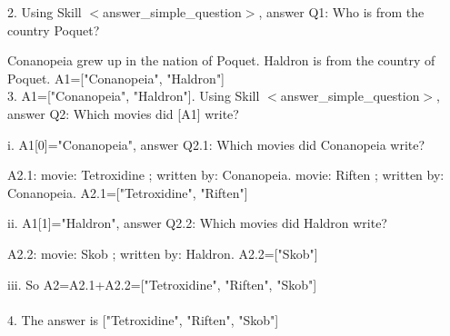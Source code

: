 \documentclass{article} %
\begin{document}
\begin{tcolorbox}[title = {CommaQA-E}, colback = Apricot!25!white, colframe = BrickRed!75!black]
\quad
   
2. Using Skill $<$answer\_simple\_question$>$, answer Q1: Who is from the country Poquet? 

Conanopeia grew up in the nation of Poquet. Haldron is from the country of Poquet. A1=["Conanopeia", "Haldron"] \\
3. A1=["Conanopeia", "Haldron"]. Using Skill $<$answer\_simple\_question$>$, answer Q2: Which movies did [A1] write? 

\quad

   \qquad  i. A1[0]="Conanopeia", answer Q2.1: Which movies did Conanopeia write? 

   \qquad \qquad  A2.1: movie: Tetroxidine ; written by: Conanopeia. movie: Riften ; written by: Conanopeia.   A2.1=["Tetroxidine", "Riften"] 
   
    \qquad ii. A1[1]="Haldron", answer Q2.2: Which movies did Haldron write? 
    
    \qquad \qquad  A2.2: movie: Skob ; written by: Haldron. A2.2=["Skob"] 
    
   \qquad  iii. So A2=A2.1+A2.2=["Tetroxidine", "Riften", "Skob"] \\ \\
4. The answer is ["Tetroxidine", "Riften", "Skob"] \\  
\end{tcolorbox}
\noindent\begin{minipage}{\textwidth}
 \label{Tab:example_compose_qa_skill}
\end{minipage}



\newpage
\end{document}
